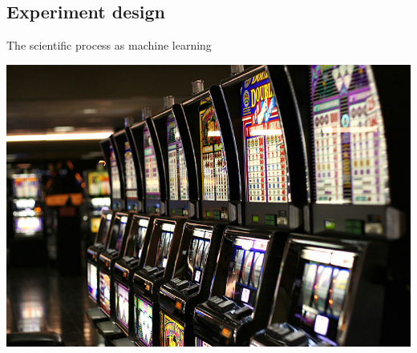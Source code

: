 \documentclass{beamer}
\begin{document}
\subsection{Experiment design}
\begin{frame}
  \centering
  \Huge{The scientific process as machine learning}
\end{frame}
\begin{frame}
  \centering
  \includegraphics[width=\textwidth]{figures/Las_Vegas_slot_machines}
\end{frame}
\end{document}
